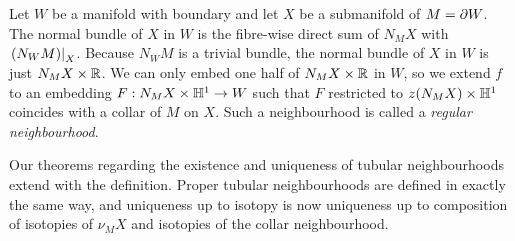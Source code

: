 \begin{defn}
	\label{def:halfneighbourhood}
	Let $W$ be a manifold with boundary and let $X$ be a submanifold of $M=\partial W$.
	The normal bundle of $X$ in $W$ is the fibre-wise direct sum of $N_M X$ with $\left.(N_W M)\right|_{X}$.
	Because $N_W M$ is a trivial bundle, the normal bundle of $X$ in $W$ is just $N_M X\times \mathbb{R}$.
	We can only embed one half of $N_M X\times \mathbb{R}$ in $W$, so we extend $f$ to an embedding $F:N_M X\times \mathbb{H}^1\to W$ such that $F$ restricted to $z(N_M X)\times\mathbb{H}^1$ coincides with a collar of $M$ on $X$.
	Such a neighbourhood is called a \emph{regular neighbourhood}.
\end{defn}

Our theorems regarding the existence and uniqueness of tubular neighbourhoods extend with the definition.
Proper tubular neighbourhoods are defined in exactly the same way, and uniqueness up to isotopy is now uniqueness up to composition of isotopies of $\nu_M X$ and isotopies of the collar neighbourhood.